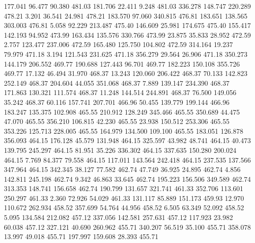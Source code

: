  177.041   96.477   90.380       481.03
 181.706   22.411    9.248       481.03
 336.278  148.747  220.289       478.21
   3.201   36.541   24.981       478.21
 183.570   97.060  340.815       476.81
 183.651  138.565  303.003       476.81
   5.058   92.229  213.487       475.40
 146.609   25.981  174.675       475.40
 155.417  142.193   94.952       473.99
 163.434  135.576  330.766       473.99
  23.875   35.833   28.952       472.59
   2.757  123.477  237.006       472.59
 165.480  125.750  104.802       472.59
 314.164   19.237   79.979       471.18
   3.194  121.543  231.625       471.18
 356.279   29.564   26.906       471.18
 350.273  144.179  206.552       469.77
 190.688  127.443   96.701       469.77
 182.223  150.108  355.726       469.77
  17.132   46.494   31.970       468.37
  13.243  120.060  206.422       468.37
  70.133  142.823  252.149       468.37
 204.604   44.055  351.068       468.37
   7.889  139.147  234.390       468.37
 171.863  130.321  111.574       468.37
  11.248  144.514  244.891       468.37
  76.500  149.056   35.242       468.37
  60.116  157.741  207.701       466.96
  50.455  139.779  199.144       466.96
 183.247  135.375  102.908       465.55
 210.912  128.249  345.466       465.55
 350.689   44.475   47.070       465.55
 356.210  106.815   42.230       465.55
  23.938  150.512  253.306       465.55
 353.226  125.713  228.005       465.55
 164.979  134.500  109.100       465.55
 183.051  126.878  356.093       464.15
 176.128   45.579  131.948       464.15
 325.597   43.982   48.741       464.15
  40.473  139.795  245.297       464.15
  81.951   35.226  336.302       464.15
 337.635  150.280  200.024       464.15
   7.769   84.377   79.558       464.15
 117.011  143.564  242.418       464.15
 237.535  137.566  347.964       464.15
 342.345   38.127   77.582       462.74
  47.749   36.925   24.895       462.74
   4.856  142.811  245.198       462.74
   9.342   46.863   33.645       462.74
 195.223  156.506  349.589       462.74
 313.353  148.741  156.658       462.74
 190.799  131.657  321.741       461.33
 352.706  113.601  250.297       461.33
   2.360   72.926   54.029       461.33
 131.117   85.889  151.173       459.93
  12.970  110.672  262.934       458.52
 357.699   54.764   44.956       458.52
   6.505   63.349   52.092       458.52
   5.095  134.584  212.082       457.12
 337.056  142.581  257.631       457.12
 117.923   23.982   60.038       457.12
 327.121   40.690  260.962       455.71
 340.207   56.519   35.100       455.71
 358.078   13.997   49.018       455.71
 197.997  159.608   28.393       455.71
